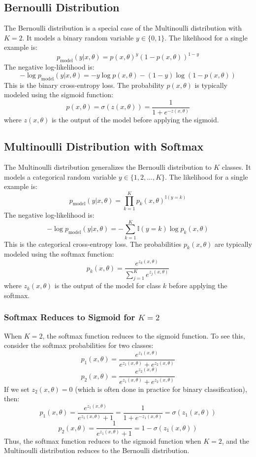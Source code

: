 \begin{notechapter}
\subsection{Bernoulli Distribution}
The Bernoulli distribution is a special case of the Multinoulli distribution with \( K = 2 \). It models a binary random variable \( y \in \{0, 1\} \). The likelihood for a single example is:
\[
p_{\text{model}}(y | x, \theta) = p(x, \theta)^y (1 - p(x, \theta))^{1 - y}
\]
The negative log-likelihood is:
\[
-\log p_{\text{model}}(y | x, \theta) = -y \log p(x, \theta) - (1 - y) \log (1 - p(x, \theta))
\]
This is the binary cross-entropy loss. The probability \( p(x, \theta) \) is typically modeled using the sigmoid function:
\[
p(x, \theta) = \sigma(z(x, \theta)) = \frac{1}{1 + e^{-z(x, \theta)}}
\]
where \( z(x, \theta) \) is the output of the model before applying the sigmoid.

\subsection{Multinoulli Distribution with Softmax}
The Multinoulli distribution generalizes the Bernoulli distribution to \( K \) classes. It models a categorical random variable \( y \in \{1, 2, \dots, K\} \). The likelihood for a single example is:
\[
p_{\text{model}}(y | x, \theta) = \prod_{k=1}^K p_k(x, \theta)^{\mathbb{I}(y = k)}
\]
The negative log-likelihood is:
\[
-\log p_{\text{model}}(y | x, \theta) = -\sum_{k=1}^K \mathbb{I}(y = k) \log p_k(x, \theta)
\]
This is the categorical cross-entropy loss. The probabilities \( p_k(x, \theta) \) are typically modeled using the softmax function:
\[
p_k(x, \theta) = \frac{e^{z_k(x, \theta)}}{\sum_{j=1}^K e^{z_j(x, \theta)}}
\]
where \( z_k(x, \theta) \) is the output of the model for class \( k \) before applying the softmax.

\subsubsection{Softmax Reduces to Sigmoid for \( K = 2 \)}
When \( K = 2 \), the softmax function reduces to the sigmoid function. To see this, consider the softmax probabilities for two classes:
\[
p_1(x, \theta) = \frac{e^{z_1(x, \theta)}}{e^{z_1(x, \theta)} + e^{z_2(x, \theta)}}
\]
\[
p_2(x, \theta) = \frac{e^{z_2(x, \theta)}}{e^{z_1(x, \theta)} + e^{z_2(x, \theta)}}
\]
If we set \( z_2(x, \theta) = 0 \) (which is often done in practice for binary classification), then:
\[
p_1(x, \theta) = \frac{e^{z_1(x, \theta)}}{e^{z_1(x, \theta)} + 1} = \frac{1}{1 + e^{-z_1(x, \theta)}} = \sigma(z_1(x, \theta))
\]
\[
p_2(x, \theta) = \frac{1}{e^{z_1(x, \theta)} + 1} = 1 - \sigma(z_1(x, \theta))
\]
Thus, the softmax function reduces to the sigmoid function when \( K = 2 \), and the Multinoulli distribution reduces to the Bernoulli distribution.


\end{notechapter}
